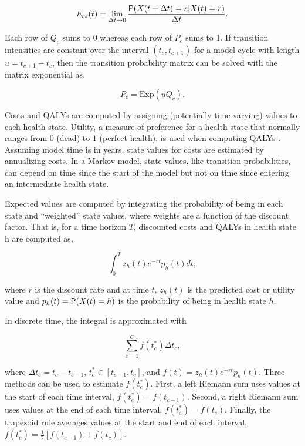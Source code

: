 \documentclass[article, nojss]{jss}\usepackage[]{graphicx}\usepackage[]{color}
\begin{document}
\begin{equation} \label{eqn:hazard}
h_{rs}(t) = \lim_{\Delta t\to 0} \frac{\mathsf{P}(X(t + \Delta t) = s | X(t) = r)}{\Delta t}.
\end{equation}

Each row of $Q_c$ sums to 0 whereas each row of $P_c$ sums to 1. If transition intensities are constant over the interval $(t_c, t_{c+1})$ for a model cycle with length $u = t_{c+1}-t_c$, then the transition probability matrix can be solved with the matrix exponential as,

\begin{equation} \label{eqn:expmat}
P_c = \textrm{Exp}(uQ_c).
\end{equation}

Costs and QALYs are computed by assigning (potentially time-varying) values to each health state. Utility, a measure of preference for a health state that normally ranges from $0$ (dead) to $1$ (perfect health), is used when computing QALYs \citep{torrance1986measurement}. Assuming model time is in years, state values for costs are estimated by annualizing costs. In a Markov model, state values, like transition probabilities, can depend on time since the start of the model but not on time since entering an intermediate health state.

Expected values are computed by integrating the probability of being in each state and ``weighted'' state values, where weights are a function of the discount factor. That is, for a time horizon $T$, discounted costs and QALYs in health state h are computed as,

\begin{equation} \label{eqn:cohort-costs-qalys}
\int_0^{T} z_h(t) e^{-rt} p_h(t) dt,
\end{equation}

where $r$ is the discount rate and at time $t$, $z_h(t)$ is the predicted cost or utility value and $p_{h}(t) = \mathsf{P}(X(t) = h)$ is the probability of being in health state $h$. 

In discrete time, the integral is approximated with

\begin{equation} \label{eqn:riemann-sum}
\sum_{c = 1}^{C}f(t_c^{*})\Delta t_c,
\end{equation}

where $\Delta t_c = t_{c} - t_{c-1}$,  $t_c^{*}\in[t_{c-1},t_{c}]$, and $f(t)= z_h(t) e^{-rt} p_h(t)$. Three methods can be used to estimate $f(t_c^{*})$. First, a left Riemann sum uses values at the start of each time interval, $f(t_c^{*}) = f(t_{c-1})$. Second, a right Riemann sum uses values at the end of each time interval, $f(t_c^{*}) = f(t_{c})$. Finally, the trapezoid rule averages values at the start and end of each interval, $f(t_c^{*}) = \frac{1}{2}[f(t_{c-1}) + f(t_{c})]$. 
\end{document}
